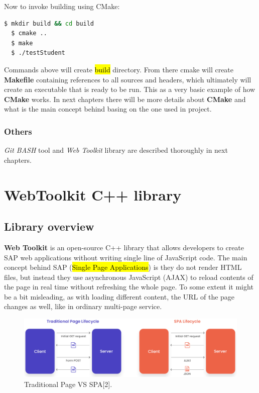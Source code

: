 \documentclass[a4paper,12pt]{article}
\newcommand\tab[1][1cm]{\hspace*{#1}}
\begin{document}
{{\noindent Now to invoke building using CMake:
\begin{lstlisting}[language=bash]
  $ mkdir build && cd build
  $ cmake ..
  $ make
  $ ./testStudent
\end{lstlisting}
  
\bigskip Commands above will create \hl{build} directory. From there cmake will create \textbf{Makefile} containing references to all sources and headers, which ultimately will create an executable that is ready to be run. This as a very basic example of how \textbf{CMake} works. In next chapters there will be more details about \textbf{CMake} and what is the main concept behind basing on the one used in project. 

}

\subsubsection*{Others}
\textit{Git BASH} tool and \textit{Web Toolkit} library are described thoroughly in next chapters.
\newpage

\section{WebToolkit C++ library}
\subsection{Library overview}
{\tab \textbf{Web Toolkit} is an open-source C++ library that allows developers to create SAP web applications without writing single line of JavaScript code. The main concept behind \cite{singlepageapplications}SAP (\hl{Single Page Applications}) is they do not render HTML files, but instead they use asynchronous JavaScript (AJAX) to reload contents of the page in real time without refreshing the whole page. To some extent it might be a bit misleading, as with loading different content, the URL of the page changes as well, like in ordinary multi-page service.

\begin{figure}[h]
  \centering
    \includegraphics[width=1.0\textwidth]{spa}
    \caption{Traditional Page VS SPA[2].}
\end{figure}

}}
\end{document}
